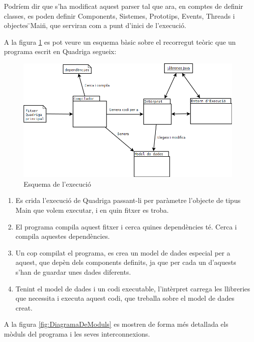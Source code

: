   Podríem dir que s'ha modificat aquest parser tal que ara, en comptes de definir classes, es poden definir Components, Sistemes, Prototips, Events, Threads i objectes \"{}Main\"{}, que serviran com a punt d'inici de l'execució.
  
  A la figura \ref{fig:EsquemaExecucio} es pot veure un esquema bàsic sobre el recorregut teòric que un programa escrit en Quadriga segueix:
  
  \begin{figure}
    \includegraphics[width=1\linewidth]{./img/EsquemaExecucio.png}
    \caption{Esquema de l'execució \label{fig:EsquemaExecucio}}
  \end{figure}
  
  \begin{enumerate}
    \item Es crida l'execució de Quadriga passant-li per paràmetre l'objecte de tipus Main que volem executar, i en quin fitxer es troba.
    \item El programa compila aquest fitxer i cerca quines dependències té. Cerca i compila aquestes dependències.
    \item Un cop compilat el programa, es crea un model de dades especial per a aquest, que depèn dels components definits, ja que per cada un d'aquests s'han de guardar unes dades diferents.
    \item Tenint el model de dades i un codi executable, l'intèrpret carrega les llibreries que necessita i executa aquest codi, que treballa sobre el model de dades creat.
  \end{enumerate}
  
  A la figura \ref{fig:DiagramaDeModuls} es mostren de forma més detallada els mòduls del programa i les seves interconnexions.

